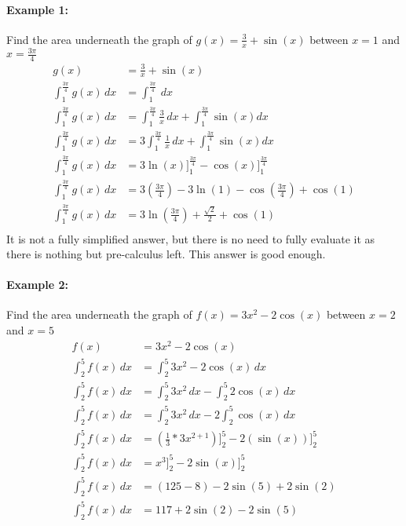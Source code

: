 \documentclass[../revisedmain.tex]{subfiles}
\begin{document}
\paragraph{Example 1:} Find the area underneath the graph of $g(x)=\displaystyle\frac{3}{x}+\sin(x)$ between $x=1$ and $x=\displaystyle\frac{3\pi}{4}$
\begin{equation}
	\begin{split}
		g(x)&=\frac{3}{x}+\sin(x)\\
		\int_{1}^{\frac{3\pi}{4}}g(x)\, dx&=\int_{1}^{\frac{3\pi}{4}}\, dx\\
		\int_{1}^{\frac{3\pi}{4}}g(x)\, dx&=\int_{1}^{\frac{3\pi}{4}}\frac{3}{x}\, dx+\int_{1}^{\frac{3\pi}{4}} \sin(x)dx\\
		\int_{1}^{\frac{3\pi}{4}}g(x)\, dx&=3\int_{1}^{\frac{3\pi}{4}}\frac{1}{x}\, dx+\int_{1}^{\frac{3\pi}{4}}\sin(x)dx\\
		\int_{1}^{\frac{3\pi}{4}}g(x)\, dx&=3\ln(x)]_{1}^{\frac{3\pi}{4}}-\cos(x)]_{1}^{\frac{3\pi}{4}}\\
		\int_{1}^{\frac{3\pi}{4}}g(x)\, dx&=3\left( \frac{3\pi}{4} \right)-3\ln(1)-\cos
		\left( \frac{3\pi}{4} \right)+\cos(1)\\
		\int_{1}^{\frac{3\pi}{4}}g(x)\, dx&=3\ln\left(\frac{3\pi}{4}\right)+\frac{\sqrt{2}}{2}+\cos(1)\\
	\end{split}
\end{equation}It is not a fully simplified answer, but there is no need to fully evaluate it as there is nothing but pre-calculus left. This answer is good enough.\\
\paragraph{Example 2:} Find the area underneath the graph of $f(x)=3x^2-2\cos(x)$ between $x=2$ and $x=5$
\begin{equation}
	\begin{split}
		f(x)&=3x^2-2\cos(x)\\
		\int_{2}^{5}f(x)\, dx&=\int_{2}^{5}3x^2-2\cos(x)\, dx\\
		\int_{2}^{5}f(x)\, dx&=\int_{2}^{5}3x^2\, dx - \int_{2}^{5}2\cos(x)\, dx\\
		\int_{2}^{5}f(x)\, dx&=\int_{2}^{5}3x^2\, dx - 2\int_{2}^{5}\cos(x)\, dx\\
		\int_{2}^{5}f(x)\, dx&=\left(\frac{1}{3}*3x^{2+1}\right)]_{2}^{5} - 2(\sin(x))]_{2}^{5}\\
		\int_{2}^{5}f(x)\, dx&=x^3]_{2}^{5} - 2\sin(x)]_{2}^{5}\\
		\int_{2}^{5}f(x)\, dx&=(125-8) - 2\sin(5) + 2\sin(2)\\
		\int_{2}^{5}f(x)\, dx&=117+2\sin(2)-2\sin(5)\\
	\end{split}
\end{equation}
\end{document}
